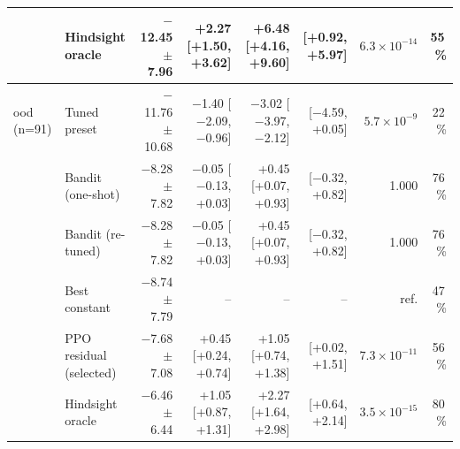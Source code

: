 \begin{table}[t]
\begin{tabular}{llrrrrrr}
 & Hindsight oracle & $-$12.45 $\pm$ 7.96 & +2.27 [+1.50, +3.62] & +6.48 [+4.16, +9.60] & [+0.92, +5.97] & $6.3{\times}10^{-14}$ & 55\,\%\\
\midrule
ood (n=91) & Tuned preset & $-$11.76 $\pm$ 10.68 & $-$1.40 [$-$2.09, $-$0.96] & $-$3.02 [$-$3.97, $-$2.12] & [$-$4.59, +0.05] & $5.7{\times}10^{-9}$ & 22\,\%\\
 & Bandit (one-shot) & $-$8.28 $\pm$ 7.82 & $-$0.05 [$-$0.13, +0.03] & +0.45 [+0.07, +0.93] & [$-$0.32, +0.82] & 1.000 & 76\,\%\\
 & Bandit (re-tuned) & $-$8.28 $\pm$ 7.82 & $-$0.05 [$-$0.13, +0.03] & +0.45 [+0.07, +0.93] & [$-$0.32, +0.82] & 1.000 & 76\,\%\\
 & Best constant & $-$8.74 $\pm$ 7.79 & -- & -- & -- & ref. & 47\,\%\\
 & PPO residual (selected) & $-$7.68 $\pm$ 7.08 & +0.45 [+0.24, +0.74] & +1.05 [+0.74, +1.38] & [+0.02, +1.51] & $7.3{\times}10^{-11}$ & 56\,\%\\
 & Hindsight oracle & $-$6.46 $\pm$ 6.44 & +1.05 [+0.87, +1.31] & +2.27 [+1.64, +2.98] & [+0.64, +2.14] & $3.5{\times}10^{-15}$ & 80\,\%\\
\bottomrule
\end{tabular}
\end{table}
